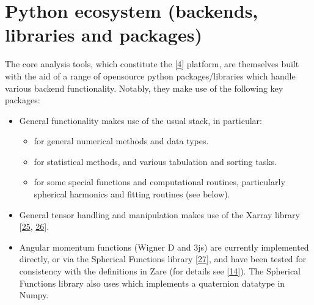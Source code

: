 \documentclass[letterpaper,table,10pt,english]{jupyterBook}
\begin{document}
\section{Python ecosystem (backends, libraries and packages)}
\label{\detokenize{part1/platform_intro_071122:python-ecosystem-backends-libraries-and-packages}}\label{\detokenize{part1/platform_intro_071122:sect-platform-pythonecosystem}}
\sphinxAtStartPar
The core analysis tools, which constitute the  {[}\hyperlink{cite.backmatter/bibliography:id574}{4}{]} platform, are themselves built with the aid of a range of open\sphinxhyphen{}source python packages/libraries which handle various backend functionality. Notably, they make use of the following key packages:
\begin{itemize}
\item {} 
\sphinxAtStartPar
General functionality makes use of the usual  stack, in particular:
\begin{itemize}
\item {} 
\sphinxAtStartPar
{} for general numerical methods and data types.

\item {} 
\sphinxAtStartPar
{} for statistical methods, and various tabulation and sorting tasks.

\item {} 
\sphinxAtStartPar
{} for some special functions and computational routines, particularly spherical harmonics and fitting routines (see below).

\end{itemize}

\item {} 
\sphinxAtStartPar
General tensor handling and manipulation makes use of the Xarray library {[}\hyperlink{cite.backmatter/bibliography:id586}{25}, \hyperlink{cite.backmatter/bibliography:id810}{26}{]}.

\item {} 
\sphinxAtStartPar
Angular momentum functions (Wigner D and 3js) are currently implemented directly, or via the Spherical Functions library {[}\hyperlink{cite.backmatter/bibliography:id448}{27}{]}, and have been tested for consistency with the definitions in Zare (for details see  {[}\hyperlink{cite.backmatter/bibliography:id506}{14}{]}). The Spherical Functions library also uses  which implements a quaternion datatype in Numpy.


\end{itemize}
\end{document}
